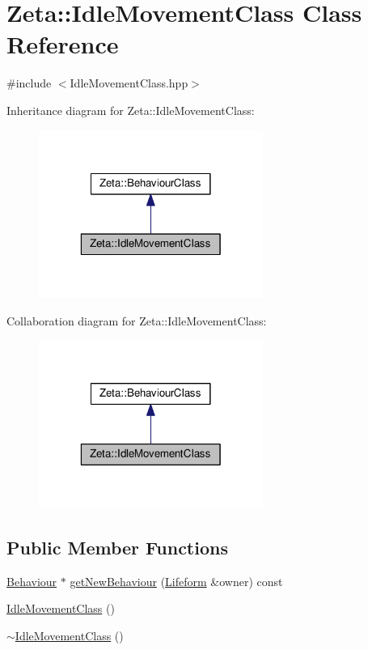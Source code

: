 \hypertarget{classZeta_1_1IdleMovementClass}{\section{Zeta\+:\+:Idle\+Movement\+Class Class Reference}
\label{classZeta_1_1IdleMovementClass}
}


{\ttfamily \#include $<$Idle\+Movement\+Class.\+hpp$>$}



Inheritance diagram for Zeta\+:\+:Idle\+Movement\+Class\+:\nopagebreak
\begin{figure}[H]
\begin{center}
\leavevmode
\includegraphics[width=208pt]{classZeta_1_1IdleMovementClass__inherit__graph}
\end{center}
\end{figure}


Collaboration diagram for Zeta\+:\+:Idle\+Movement\+Class\+:\nopagebreak
\begin{figure}[H]
\begin{center}
\leavevmode
\includegraphics[width=208pt]{classZeta_1_1IdleMovementClass__coll__graph}
\end{center}
\end{figure}
\subsection*{Public Member Functions}
\begin{DoxyCompactItemize}
\item 
\hyperlink{classZeta_1_1Behaviour}{Behaviour} $\ast$ \hyperlink{classZeta_1_1IdleMovementClass_a4ba32888d1561f7b5820d2620e7762e9}{get\+New\+Behaviour} (\hyperlink{classZeta_1_1Lifeform}{Lifeform} \&owner) const 
\item 
\hyperlink{classZeta_1_1IdleMovementClass_a69973c6d5799cea639fc1c561367d287}{Idle\+Movement\+Class} ()
\item 
\hyperlink{classZeta_1_1IdleMovementClass_af9298775f530af8dccd910c056fe6a3c}{$\sim$\+Idle\+Movement\+Class} ()
\end{DoxyCompactItemize}


